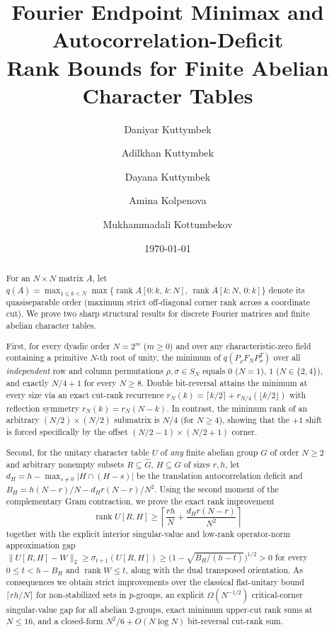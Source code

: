 \documentclass[11pt,reqno]{amsart}
\title[Fourier Endpoint Minimax and Deficit Rank Bounds]{Fourier Endpoint Minimax and Autocorrelation-Deficit\\Rank Bounds for Finite Abelian Character Tables}
\author[D. Kuttymbek]{Daniyar Kuttymbek}
\author[A. Kuttymbek]{Adilkhan Kuttymbek}
\author[D. Kuttymbek]{Dayana Kuttymbek}
\author[A. Kolpenova]{Amina Kolpenova}
\author[M. Kottumbekov]{Mukhammadali Kottumbekov}
\date{\today}
\numberwithin{equation}{section}
\theoremstyle{definition}
\theoremstyle{remark}
\newcommand{\rank}{\operatorname{rank}}
\begin{document}
\begin{abstract}
For an $N\times N$ matrix $A$, let $q(A)=\max_{1\le k<N}\max\{\rank A[0{:}k,\,k{:}N],\,\rank A[k{:}N,\,0{:}k]\}$ denote its quasiseparable order (maximum strict off-diagonal corner rank across a coordinate cut). We prove two sharp structural results for discrete Fourier matrices and finite abelian character tables.

First, for every dyadic order $N=2^m$ ($m\ge 0$) and over any characteristic-zero field containing a primitive $N$-th root of unity, the minimum of $q(P_\rho F_N P_\sigma^T)$ over all \emph{independent} row and column permutations $\rho,\sigma\in S_N$ equals $0$ ($N=1$), $1$ ($N\in\{2,4\}$), and exactly $N/4+1$ for every $N\ge 8$. Double bit-reversal attains the minimum at every size via an exact cut-rank recurrence $r_N(k)=\lceil k/2\rceil + r_{N/4}(\lfloor k/2\rfloor)$ with reflection symmetry $r_N(k)=r_N(N-k)$. In contrast, the minimum rank of an arbitrary $(N/2)\times(N/2)$ submatrix is $N/4$ (for $N\ge 4$), showing that the $+1$ shift is forced specifically by the offset $(N/2-1)\times(N/2+1)$ corner.

Second, for the unitary character table $U$ of \emph{any} finite abelian group $G$ of order $N\ge 2$ and arbitrary nonempty subsets $R\subseteq\widehat{G}$, $H\subseteq G$ of sizes $r,h$, let $d_H = h - \max_{s\neq 0}|H\cap(H-s)|$ be the translation autocorrelation deficit and $B_H = h(N-r)/N - d_H r(N-r)/N^2$. Using the second moment of the complementary Gram contraction, we prove the exact rank improvement
\[
\rank U[R,H] \ge \left\lceil \frac{rh}{N} + \frac{d_H r(N-r)}{N^2}\right\rceil
\]
together with the explicit interior singular-value and low-rank operator-norm approximation gap $\|U[R,H]-W\|_2 \ge \sigma_{t+1}(U[R,H]) \ge \bigl(1-\sqrt{B_H/(h-t)}\bigr)^{1/2} > 0$ for every $0\le t < h-B_H$ and $\rank W\le t$, along with the dual transposed orientation. As consequences we obtain strict improvements over the classical flat-unitary bound $\lceil rh/N\rceil$ for non-stabilized sets in $p$-groups, an explicit $\Omega(N^{-1/2})$ critical-corner singular-value gap for all abelian $2$-groups, exact minimum upper-cut rank sums at $N\le 16$, and a closed-form $N^2/6 + O(N\log N)$ bit-reversal cut-rank sum.
\end{abstract}

\maketitle
\end{document}
